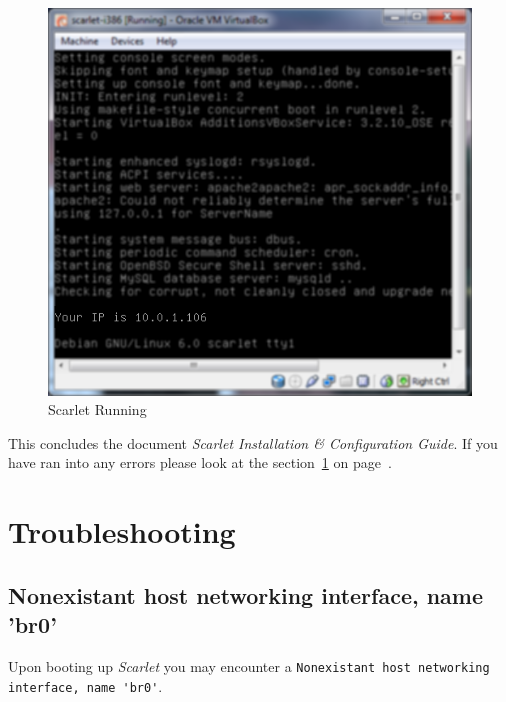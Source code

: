 \documentclass[pdftex,11pt,letterpaper]{article}
\begin{document}
\begin{enumerate}
    \begin{figure}[H]
        \begin{center}
        \leavevmode
            \includegraphics[]{scarlet_images/scarlet_running_blurred.png}
        \end{center}
        \caption{Scarlet Running}
        \label{fig:scarlet_running}
    \end{figure}

\end{enumerate}

This concludes the document \emph{Scarlet Installation \& Configuration Guide}.  If you have ran into any errors please look at the section~\ref{sec:troubleshooting} on page~\pageref{sec:troubleshooting}.

\section{Troubleshooting}
\label{sec:troubleshooting}

\subsection{Nonexistant host networking interface, name 'br0'}

Upon booting up \textit{Scarlet} you may encounter a \verb+Nonexistant host networking interface, name 'br0'+.
\end{document}
